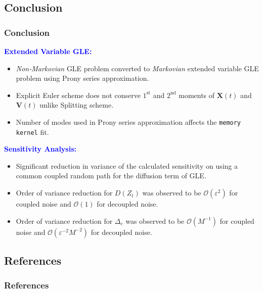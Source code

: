 \documentclass[a4paper,10pt]{beamer}
\newcommand{\BS}[1]{\boldsymbol{#1}}
\newcommand{\rb}[1]{\left( #1 \right)}
\begin{document}
	\begin{frame}
		\section{Conclusion}
		\frametitle{Conclusion}
		\textcolor{blue}{\textbf{Extended Variable GLE:}}
		\begin{itemize}
			\item {\textit{Non-Markovian} GLE problem converted to \textit{Markovian} extended variable GLE problem using Prony series approximation.}
			\item {Explicit Euler scheme does not conserve $1^{\text{st}}$ and $2^{\text{nd}}$ moments of $\BS{X}(t)$ and $\BS{V}(t)$ unlike Splitting scheme.}
			\item {Number of modes used in Prony series approximation affects the \texttt{memory kernel} fit.}
		\end{itemize}
		\textcolor{blue}{\textbf{Sensitivity Analysis:}}
		\begin{itemize}
			\item {Significant reduction in variance of the calculated sensitivity on using a common coupled random path for the diffusion term of GLE.}
			\item {Order of variance reduction for $D\rb{Z_{t}}$ was observed to be $\mathcal{O}\rb{\varepsilon^{2}}$ for coupled noise and $\mathcal{O}\rb{1}$ for decoupled noise.}
			\item {Order of variance reduction for $\Delta_{c}$ was observed to be $\mathcal{O}\rb{M^{-1}}$ for coupled noise and $\mathcal{O}\rb{\varepsilon^{-2}M^{-2}}$ for decoupled noise.}
		\end{itemize}
	\end{frame}
		
	\begin{frame}[allowframebreaks]
		\section{References}
		\frametitle{References}
		\footnotesize
		\nocite{Baczewski2013}
		\nocite{Berne1966}
		\nocite{Desposito2009}
		\nocite{Hall2016}
		\nocite{Higham2001}
		\nocite{Kawasaki1973}
		\nocite{Leimkuhler2015}
		\nocite{Lysy2016}
		\nocite{Vinales2006}
		
	\end{frame}
\end{document}
